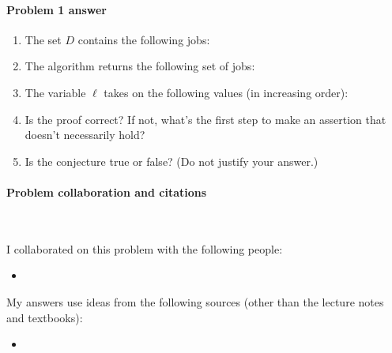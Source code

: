
\paragraph{Problem 1 answer} 

\begin{enumerate}

\item The set $D$ contains the following jobs:

  \BLUE{
    \[
      \REPLACEME
    \]
  }

\item The algorithm returns the following set of jobs:

  \BLUE{
    \[
      \{ \REPLACEME \}
    \]
  }

\item The variable $\ell$ takes on the following values (in increasing order):

  \BLUE{
    \[
      \REPLACEME
    \]
  }
  
\item Is the proof correct?  If not, what's the first step to make an assertion that doesn't necessarily hold?

  \BLUE{
    \REPLACEME
  }

\item Is the conjecture true or false?  (Do not justify your answer.)

  \BLUE{
    \REPLACEME
  }

\end{enumerate}


\newpage

\paragraph{Problem  collaboration and citations}~

I collaborated on this problem with the following people:
\begin{blue}
  \begin{itemize}
  \item \REPLACEME                    %
  \end{itemize}
\end{blue}

My answers use ideas from the following sources (other than the lecture notes and textbooks): 
\begin{blue}
  \begin{itemize}
  \item \REPLACEME                    %
  \end{itemize}
\end{blue}


